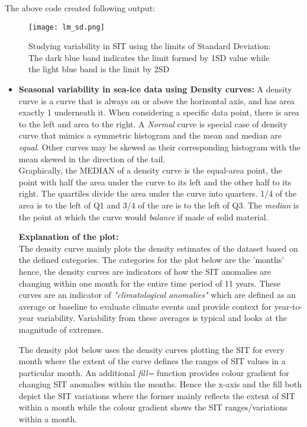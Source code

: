\documentclass{article} %
\begin{document}
The above code created following output: 

\begin{figure}[h]
    \centering
    \texttt{[image: lm\_sd.png]}%
    \caption{Studying variability in SIT using the limits of Standard Deviation: The dark blue band indicates the limit formed by 1SD value while the light blue band is the limit by 2SD}
    \label{fig:LM_R} %
    
\end{figure}

\begin{itemize}
    \item {\bf Seasonal variability in sea-ice data using Density curves:}
    A density curve is a curve that is always on or above the horizontal axis, and has area exactly 1 underneath it. When considering a specific data point, there is area to the left and area to the right. A {\it Normal} curve is special case of density curve that mimics a symmetric histogram and the mean and median are {\it equal}. Other curves may be skewed as their corresponding histogram with the mean skewed in the direction of the tail.\\
    Graphically, the MEDIAN of a density curve is the equal-area point, the point with half the area under the curve to its left and the other half to its right.  The quartiles divide the area under the curve into quarters.  1/4 of the area is to the left of Q1 and 3/4 of the are is to the left of Q3. The {\it median} is the point at which the curve would {\it balance} if made of solid material.
    
    {\bf Explanation of the plot:} \\
    
    The density curve mainly plots the density estimates of the dataset based on the defined categories. The categories for the plot below are the 'months' hence, the density curves are indicators of how the SIT anomalies are changing within one month for the entire time period of 11 years. These curves are an indicator of {\it "climatological anomalies"} which are defined as an average or baseline to evaluate climate events and provide context for year-to-year variability. Variability from these  averages is typical and looks at the magnitude of extremes. 
    
    The density plot below uses the density curves plotting the SIT for every month where the extent of the curve defines the ranges of SIT values in a particular month. An additional {\it fill=} function provides colour gradient for changing SIT anomalies within the months. Hence the x-axis and the fill both depict the SIT variations where the former mainly reflects the extent of SIT within a month while the colour gradient shows the SIT ranges/variations within a month.
    

\end{itemize}
\end{document}

